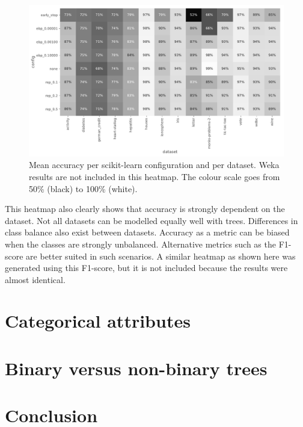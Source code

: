 \begin{figure}[htp]
    \includegraphics[width=\textwidth]{img/heatmap_accuracy.pdf}
    \caption{Mean accuracy per scikit-learn configuration and per dataset. Weka results are not included in this heatmap. The colour scale goes from 50\% (black) to 100\% (white).}%
    \label{fig:heat_acc}
\end{figure}

This heatmap also clearly shows that accuracy is strongly dependent on the dataset. Not all datasets can be modelled equally well with trees. Differences in class balance also exist between datasets. Accuracy as a metric can be biased when the classes are strongly unbalanced. Alternative metrics such as the F1-score are better suited in such scenarios. A similar heatmap as shown here was generated using this F1-score, but it is not included because the results were almost identical.


\section{Categorical attributes}

\section{Binary versus non-binary trees}

\section{Conclusion}
